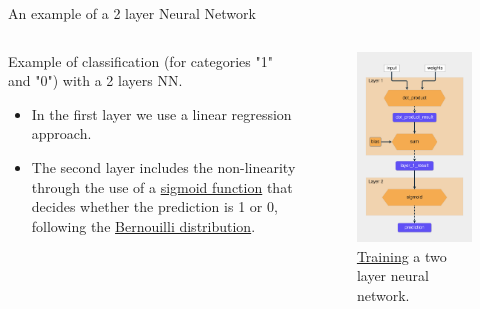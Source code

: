 \documentclass{beamer}
\begin{document}
\begin{frame}{An example of a 2 layer Neural Network}
    \begin{columns}
        \begin{column}{0.6\linewidth}     
            Example of classification (for categories "1" and "0") with a 2 layers NN. 
            \begin{itemize}
                \item In the first layer we use a linear regression approach.
                \item The second layer includes the non-linearity through the use of a \href{https://en.wikipedia.org/wiki/Sigmoid_function}{sigmoid function} that decides whether the prediction is 1 or 0, following the \href{https://en.wikipedia.org/wiki/Bernoulli_distribution}{Bernouilli distribution}.
            \end{itemize}
        \end{column}
        \begin{column}{0.4\linewidth}
            \begin{figure}
                \includegraphics[width=0.7\linewidth]{Training2Layer}
                \caption{\href{https://realpython.com/python-ai-neural-network/}{Training} a two layer neural network.}
                \label{Fig:Training2Layer}
            \end{figure}
        \end{column}
     \end{columns}
\end{frame}
\end{document}
